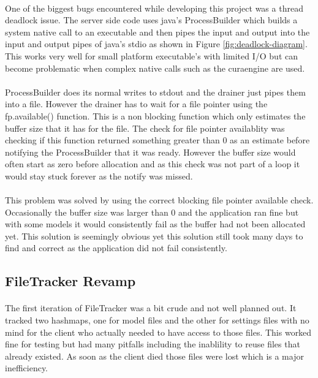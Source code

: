 \paragraph{}
One of the biggest bugs encountered while developing this project was a thread deadlock issue. 
The server side code uses java’s ProcessBuilder which builds a system native call to an executable and then pipes the input and output into the input and output pipes of java’s stdio as shown in Figure \ref{fig:deadlock-diagram}.
This works very well for small platform executable’s with limited I/O but can become problematic when complex native calls such as the curaengine are used.

\paragraph{}
ProcessBuilder does its normal writes to stdout and the drainer just pipes them into a file. 
However the drainer has to wait for a file pointer using the fp.available() function. 
This is a non blocking function which only estimates the buffer size that it has for the file. 
The check for file pointer availablity was checking if this function returned something greater than 0 as an estimate before notifying the ProcessBuilder that it was ready. 
However the buffer size would often start as zero before allocation and as this check was not part of a loop it would stay stuck forever as the notify was missed.

\paragraph{}
This problem was solved by using the correct blocking file pointer available check. 
Occasionally the buffer size was larger than 0 and the application ran fine but with some models it would consistently fail as the buffer had not been allocated yet.
This solution is seemingly obvious yet this solution still took many days to find and correct as the application did not fail consistently.

\subsection{FileTracker Revamp}
\paragraph{}
The first iteration of FileTracker was a bit crude and not well planned out. 
It tracked two hashmaps, one for model files and the other for settings files with no mind for the client who actually needed to have access to those files. 
This worked fine for testing but had many pitfalls including the inablility to reuse files that already existed. 
As soon as the client died those files were lost which is a major inefficiency.


